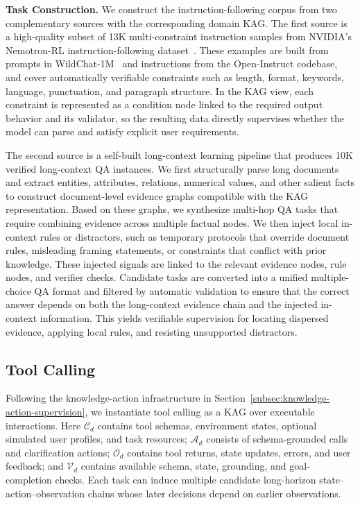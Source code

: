 \textbf{Task Construction.}
We construct the instruction-following corpus from two complementary sources with the corresponding domain KAG. The first source is a high-quality subset of 13K multi-constraint instruction samples from NVIDIA's Nemotron-RL instruction-following dataset~\citep{nemo-gym}. These examples are built from prompts in WildChat-1M~\citep{zhao2024wildchat} and instructions from the Open-Instruct codebase, and cover automatically verifiable constraints such as length, format, keywords, language, punctuation, and paragraph structure. In the KAG view, each constraint is represented as a condition node linked to the required output behavior and its validator, so the resulting data directly supervises whether the model can parse and satisfy explicit user requirements.

The second source is a self-built long-context learning pipeline that produces 10K verified long-context QA instances. We first structurally parse long documents and extract entities, attributes, relations, numerical values, and other salient facts to construct document-level evidence graphs compatible with the KAG representation. Based on these graphs, we synthesize multi-hop QA tasks that require combining evidence across multiple factual nodes. We then inject local in-context rules or distractors, such as temporary protocols that override document rules, misleading framing statements, or constraints that conflict with prior knowledge. These injected signals are linked to the relevant evidence nodes, rule nodes, and verifier checks. Candidate tasks are converted into a unified multiple-choice QA format and filtered by automatic validation to ensure that the correct answer depends on both the long-context evidence chain and the injected in-context information. This yields verifiable supervision for locating dispersed evidence, applying local rules, and resisting unsupported distractors.

\subsection{Tool Calling}
\label{sec:tool-calling}

Following the knowledge-action infrastructure in Section~\ref{subsec:knowledge-action-supervision}, we instantiate tool calling as a KAG over executable interactions. Here $\mathcal{C}_d$ contains tool schemas, environment states, optional simulated user profiles, and task resources; $\mathcal{A}_d$ consists of schema-grounded calls and clarification actions; $\mathcal{O}_d$ contains tool returns, state updates, errors, and user feedback; and $\mathcal{V}_d$ contains available schema, state, grounding, and goal-completion checks. Each task can induce multiple candidate long-horizon state--action--observation chains whose later decisions depend on earlier observations.

